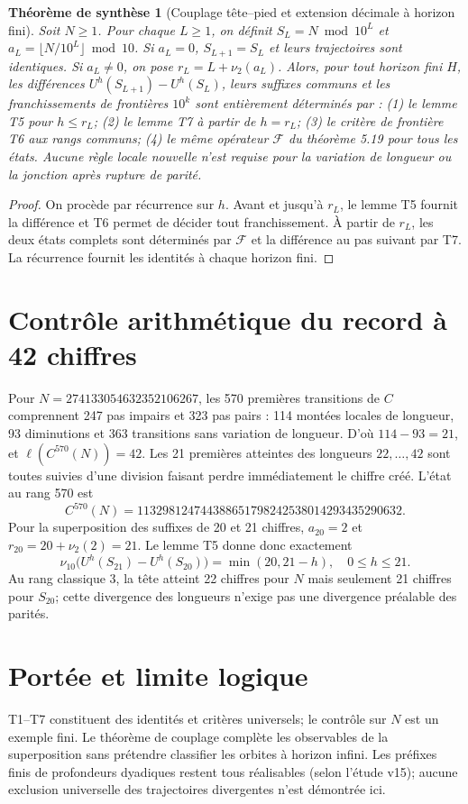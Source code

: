 \documentclass[11pt,a4paper]{article}
\newtheorem{theoreme}{Théorème de synthèse}
\newcommand{\ellg}{\ell}
\begin{document}
\begin{theoreme}[Couplage tête--pied et extension décimale à horizon fini]
Soit $N\ge1$. Pour chaque $L\ge1$, on définit
$S_L=N\bmod10^L$ et $a_L=\lfloor N/10^L\rfloor\bmod10$.
Si $a_L=0$, $S_{L+1}=S_L$ et leurs trajectoires sont identiques.
Si $a_L\neq0$, on pose $r_L=L+\nu_2(a_L)$.
Alors, pour tout horizon fini $H$, les différences
$U^h(S_{L+1})-U^h(S_L)$, leurs suffixes communs et les franchissements
de frontières $10^k$ sont entièrement déterminés par :
(1) le lemme T5 pour $h\le r_L$;
(2) le lemme T7 à partir de $h=r_L$;
(3) le critère de frontière T6 aux rangs communs;
(4) le même opérateur $\mathscr F$ du théorème 5.19 pour tous les états.
Aucune règle locale nouvelle n'est requise pour la variation de longueur
ou la jonction après rupture de parité.
\end{theoreme}
\begin{proof}
On procède par récurrence sur $h$. Avant et jusqu'à $r_L$, le lemme T5
fournit la différence et T6 permet de décider tout franchissement.
À partir de $r_L$, les deux états complets sont déterminés par
$\mathscr F$ et la différence au pas suivant par T7.
La récurrence fournit les identités à chaque horizon fini.
\end{proof}

\section*{Contrôle arithmétique du record à 42 chiffres}
Pour $N=274133054632352106267$, les 570 premières transitions de $C$
comprennent 247 pas impairs et 323 pas pairs : 114 montées locales de
longueur, 93 diminutions et 363 transitions sans variation de longueur.
D'où $114-93=21$, et $\ellg(C^{570}(N))=42$.
Les 21 premières atteintes des longueurs $22,\ldots,42$ sont toutes suivies
d'une division faisant perdre immédiatement le chiffre créé.
L'état au rang 570 est
\[
C^{570}(N)=113298124744388651798242538014293435290632.
\]
Pour la superposition des suffixes de 20 et 21 chiffres, $a_{20}=2$ et
$r_{20}=20+\nu_2(2)=21$.
Le lemme T5 donne donc exactement
\[
\nu_{10}\bigl(U^h(S_{21})-U^h(S_{20})\bigr)
=\min(20,21-h),\quad 0\le h\le21.
\]
Au rang classique $3$, la tête atteint 22 chiffres pour $N$ mais seulement
21 chiffres pour $S_{20}$; cette divergence des longueurs n'exige pas
une divergence préalable des parités.

\section*{Portée et limite logique}
T1--T7 constituent des identités et critères universels;
le contrôle sur $N$ est un exemple fini.
Le théorème de couplage complète les observables de la superposition
sans prétendre classifier les orbites à horizon infini.
Les préfixes finis de profondeurs dyadiques restent tous réalisables
(selon l'étude v15); aucune exclusion universelle des trajectoires
divergentes n'est démontrée ici.
\end{document}
